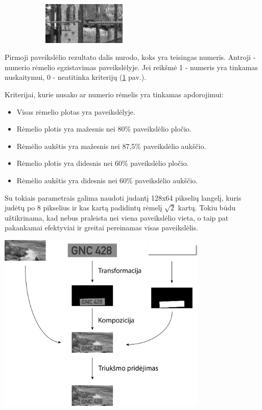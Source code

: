 \documentclass{VUMIFInfBakalaurinis}
\begin{document}
\begin{figure}[ht!]
\begin{subfigure}{\linewidth}
  \centering
  \includegraphics[width=4cm]{train_images/0_not_present.png}
\end{subfigure}
\label{img_ex}
\end{figure}
Pirmoji paveikslėlio rezultato dalis nurodo, koks yra teisingas numeris. Antroji - numerio rėmelio egzistavimas paveikslėlyje.
Jei reikšmė 1 - numeris yra tinkamas nuskaitymui, 0 - neatitinka kriterijų (\ref{img_ex} pav.). 

Kriterijai, kurie nusako ar numerio rėmelis yra tinkamas apdorojimui:

\begin{itemize}[itemsep=0.5pt]
  \item Visas rėmelio plotas yra paveikslėlyje.
  \item Rėmelio plotis yra mažesnis nei 80\% paveikslėlio pločio.
  \item Rėmėlio aukštis yra mažesnis nei 87,5\% paveikslėlio aukščio.
  \item Rėmelio plotis yra didesnis nei 60\% paveikslėlio pločio.
  \item Rėmėlio aukštis yra didesnis nei 60\% paveikslėlio aukščio.
\end{itemize}

Su tokiais parametrais galima naudoti judantį 128x64 pikselių langelį, kuris judėtų po 8 pikselius ir kas kartą padidintų rėmelį
\begin{math}
  \sqrt{2}
\end{math}
kartų. Tokiu būdu užtikrinama, kad nebus praleista nei viena paveikslėlio vieta, o taip pat pakankamai efektyviai ir greitai pereinamas
visas paveikslėlis.

\begin{minipage}{\linewidth}
  \centering
  \includegraphics[width=10cm]{train_images/generating.png}
  \label{gen_img}
\end{minipage}
\end{document}
